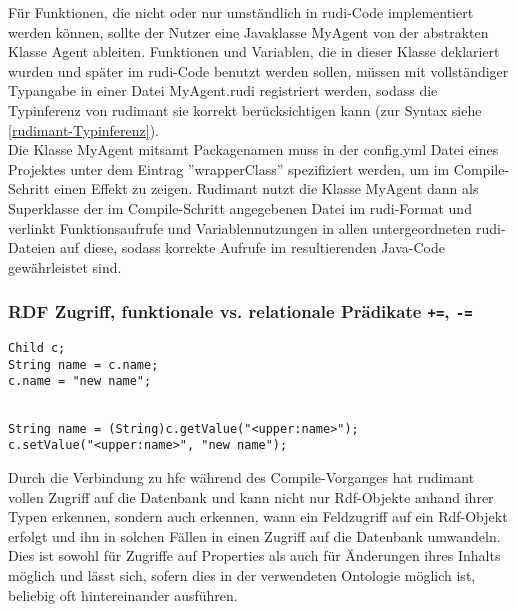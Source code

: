 Für Funktionen, die nicht oder nur umständlich in rudi-Code implementiert werden können, sollte der Nutzer eine Javaklasse MyAgent von der abstrakten Klasse Agent ableiten. Funktionen und Variablen, die in dieser Klasse deklariert wurden und später im rudi-Code benutzt werden sollen, müssen mit vollständiger Typangabe in einer Datei MyAgent.rudi registriert werden, sodass die Typinferenz von rudimant sie korrekt berücksichtigen kann (zur Syntax siehe \ref{rudimant-Typinferenz}).\\
Die Klasse MyAgent mitsamt Packagenamen muss in der config.yml Datei eines Projektes unter dem Eintrag ''wrapperClass'' spezifiziert werden, um im Compile-Schritt einen Effekt zu zeigen. Rudimant nutzt die Klasse MyAgent dann als Superklasse der im Compile-Schritt angegebenen Datei im rudi-Format und verlinkt Funktionsaufrufe und Variablennutzungen in allen untergeordneten rudi-Dateien auf diese, sodass korrekte Aufrufe im resultierenden Java-Code gewährleistet sind.

\subsubsection{RDF Zugriff, funktionale vs. relationale Prädikate
  \texttt{+=}, \texttt{-=}}

\begin{minipage}[t]{0.35\textwidth}
\begin{verbatim}
Child c;
String name = c.name;
c.name = "new name";
\end{verbatim}
\end{minipage}
\begin{minipage}[t]{0.6\textwidth}
\begin{verbatim}

String name = (String)c.getValue("<upper:name>");
c.setValue("<upper:name>", "new name");
\end{verbatim}
\end{minipage}
\vspace*{2ex}

Durch die Verbindung zu hfc während des Compile-Vorganges hat rudimant vollen Zugriff auf die Datenbank und kann nicht nur Rdf-Objekte anhand ihrer Typen erkennen, sondern auch erkennen, wann ein Feldzugriff auf ein Rdf-Objekt erfolgt und ihn in solchen Fällen in einen Zugriff auf die Datenbank umwandeln. Dies ist sowohl für Zugriffe auf Properties als auch für Änderungen ihres Inhalts möglich und lässt sich, sofern dies in der verwendeten Ontologie möglich ist, beliebig oft hintereinander ausführen.\\

